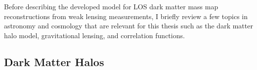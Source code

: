 \documentclass[%
 reprint,
 amsmath,amssymb,
 aps,nofootinbib
]{revtex4-1}
\begin{document}
Before describing the developed model for LOS dark matter mass map reconstructions from weak lensing measurements, I briefly review a few topics in astronomy and cosmology that are relevant for this thesis such as the dark matter halo model, gravitational lensing, and correlation functions.

\subsection{Dark Matter Halos} \label{halos}

\end{document}
